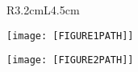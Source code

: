 \documentclass{article}
\begin{document}
\begin{figure}
    \begin{minipage}[c]{.40\linewidth}
      \centering      
        \begin{tabular}{R{3.2cm}L{4.5cm}}
          \bottomrule
        \end{tabular}
           
    \end{minipage}\hfill
    \begin{minipage}[c]{.5\linewidth}
        \centering
        \texttt{[image: [FIGURE1PATH]]}  

    \end{minipage}
\end{figure}


\begin{figure}[!h]
    \centering 
    \texttt{[image: [FIGURE2PATH]]}     
\end{figure}
\end{document}
